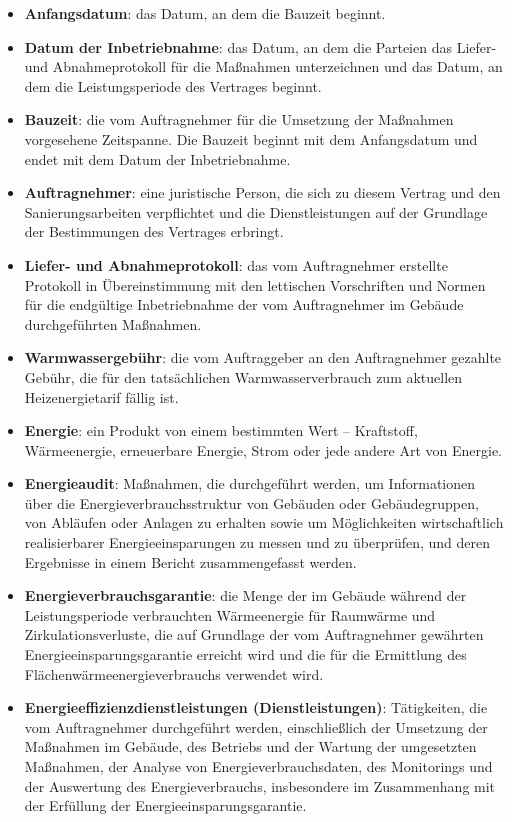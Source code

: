 \begin{multicols}{2}
\begin{itemize}[label={}]
  \item\textbf{Anfangsdatum}: das Datum, an dem die Bauzeit beginnt.
  \item\textbf{Datum der Inbetriebnahme}: das Datum, an dem die Parteien das Liefer- und Abnahmeprotokoll für die Maßnahmen unterzeichnen und das Datum, an dem die Leistungsperiode des Vertrages beginnt.
  \item\textbf{Bauzeit}: die vom Auftragnehmer für die Umsetzung der Maßnahmen vorgesehene Zeitspanne. Die Bauzeit beginnt mit dem Anfangsdatum und endet mit dem Datum der Inbetriebnahme.
  \item\textbf{Auftragnehmer}: eine juristische Person, die sich zu diesem Vertrag und den Sanierungsarbeiten verpflichtet und die Dienstleistungen auf der Grundlage der Bestimmungen des Vertrages erbringt.
  \item\textbf{Liefer- und Abnahmeprotokoll}: das vom Auftragnehmer erstellte Protokoll in Übereinstimmung mit den lettischen Vorschriften und Normen für die endgültige Inbetriebnahme der vom Auftragnehmer im Gebäude durchgeführten Maßnahmen.
  \item\textbf{Warmwassergebühr}: die vom Auftraggeber an den Auftragnehmer gezahlte Gebühr, die für den tatsächlichen Warmwasserverbrauch zum aktuellen Heizenergietarif fällig ist.
  \item\textbf{Energie}: ein Produkt von einem bestimmten Wert – Kraftstoff, Wärmeenergie, erneuerbare Energie, Strom oder jede andere Art von Energie.
  \item\textbf{Energieaudit}: Maßnahmen, die durchgeführt werden, um Informationen über die Energieverbrauchsstruktur von Gebäuden oder Gebäudegruppen, von Abläufen oder Anlagen zu erhalten sowie um Möglichkeiten wirtschaftlich realisierbarer Energieeinsparungen zu messen und zu überprüfen, und deren Ergebnisse in einem Bericht zusammengefasst werden.
  \item\textbf{Energieverbrauchsgarantie}: die Menge der im Gebäude während der Leistungsperiode verbrauchten Wärmeenergie für Raumwärme und Zirkulationsverluste, die auf  Grundlage der vom Auftragnehmer gewährten Energieeinsparungsgarantie erreicht wird und die für die Ermittlung des Flächenwärmeenergieverbrauchs verwendet wird.
  \item\textbf{Energieeffizienzdienstleistungen (Dienstleistungen)}: Tätigkeiten, die vom Auftragnehmer durchgeführt werden, einschließlich der Umsetzung der Maßnahmen im Gebäude, des Betriebs und der Wartung der umgesetzten Maßnahmen, der Analyse von Energieverbrauchsdaten, des Monitorings und der Auswertung des Energieverbrauchs, insbesondere im Zusammenhang mit der Erfüllung der Energieeinsparungsgarantie.

\end{itemize}
\end{multicols}
